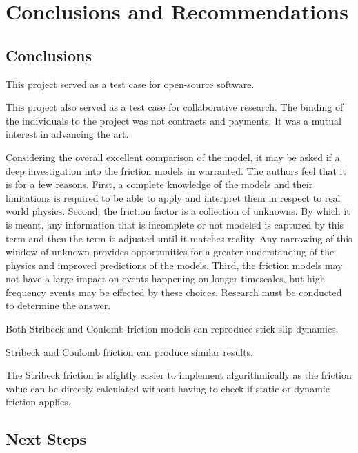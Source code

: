 \chapter{Conclusions and Recommendations}
\section{Conclusions}
This project served as a test case for open-source software.

This project also served as a test case for collaborative research.  The binding of the individuals to the project was not contracts and payments.  It was a mutual interest in advancing the art.

Considering the overall excellent comparison of the model, it may be asked if a deep investigation into the friction models in warranted. The authors feel that it is for a few reasons.  First, a complete knowledge of the models and their limitations is required to be able to apply and interpret them in respect to real world physics.  Second, the friction factor is a collection of unknowns.  By which it is meant, any information that is incomplete or not modeled is captured by this term and then the term is adjusted until it matches reality.  Any narrowing of this window of unknown provides opportunities for a greater understanding of the physics and improved predictions of the models.  Third, the friction models may not have a large impact on events happening on longer timescales, but high frequency events may be effected by these choices.  Research must be conducted to determine the answer.

\begin{bulletedlist}
	\item Both Stribeck and Coulomb friction models can reproduce stick slip dynamics.
	\item Stribeck and Coulomb friction can produce similar results.
	\item The Stribeck friction is slightly easier to implement algorithmically as the friction value can be directly calculated without having to check if static or dynamic friction applies.
\end{bulletedlist}

\section{Next Steps}
